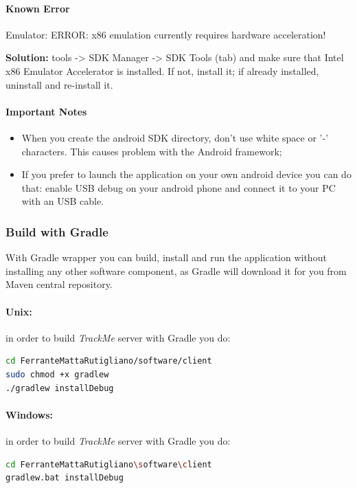 \documentclass[a4paper]{article}
\begin{document}
\paragraph{Known Error}
Emulator: ERROR: x86 emulation currently requires hardware acceleration!

\textbf{Solution:} tools -> SDK Manager -> SDK Tools (tab) and make sure that Intel x86 Emulator Accelerator is installed. If not, install it; if already installed, uninstall and re-install it.

\paragraph{Important Notes}
\begin{itemize}
    \item When you create the android SDK directory, don't use white space or '-' characters. This causes problem with the Android framework;
    \item If you prefer to launch the application on your own android device you can do that: enable USB debug on your android phone and connect it to your PC with an USB cable.
\end{itemize}

\subsubsection{Build with Gradle}
With Gradle wrapper you can build, install and run the application without installing any other software component, as Gradle will download it for you from Maven central repository.

\paragraph{Unix:} in order to build \textit{TrackMe} server with Gradle you do:

\begin{lstlisting}[language=bash]
cd FerranteMattaRutigliano/software/client
sudo chmod +x gradlew
./gradlew installDebug
\end{lstlisting}

\paragraph{Windows:} in order to build \textit{TrackMe} server with Gradle you do:

\begin{lstlisting}[language=bash]
cd FerranteMattaRutigliano\software\client
gradlew.bat installDebug
\end{lstlisting}
\end{document}
